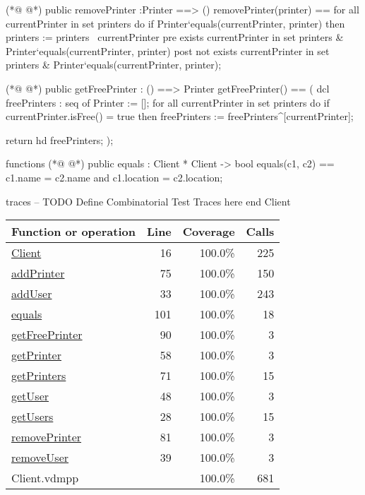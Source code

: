 \begin{vdmpp}[breaklines=true]
(*@
\label{removePrinter:81}
@*)
 public removePrinter :Printer ==> ()
  removePrinter(printer) ==
   for all currentPrinter in set printers do
    if Printer`equals(currentPrinter, printer) 
    then printers := printers \ {currentPrinter}
  pre exists currentPrinter in set printers & Printer`equals(currentPrinter, printer)
  post not exists currentPrinter  in set printers & Printer`equals(currentPrinter, printer);
  
  
(*@
\label{getFreePrinter:90}
@*)
 public getFreePrinter : () ==> Printer
 getFreePrinter() == (
 dcl freePrinters : seq of Printer := [];
 for all currentPrinter in set printers do
  if currentPrinter.isFree() = true
  then freePrinters := freePrinters^[currentPrinter];
  
  return hd freePrinters;
  );
  
functions
(*@
\label{equals:101}
@*)
public equals : Client * Client -> bool
equals(c1, c2) ==
  c1.name = c2.name and c1.location = c2.location;

traces
-- TODO Define Combinatorial Test Traces here
end Client
\end{vdmpp}
\bigskip
\begin{longtable}{|l|r|r|r|}
\hline
Function or operation & Line & Coverage & Calls \\
\hline
\hline
\hyperref[Client:16]{Client} & 16&100.0\% & 225 \\
\hline
\hyperref[addPrinter:75]{addPrinter} & 75&100.0\% & 150 \\
\hline
\hyperref[addUser:33]{addUser} & 33&100.0\% & 243 \\
\hline
\hyperref[equals:101]{equals} & 101&100.0\% & 18 \\
\hline
\hyperref[getFreePrinter:90]{getFreePrinter} & 90&100.0\% & 3 \\
\hline
\hyperref[getPrinter:58]{getPrinter} & 58&100.0\% & 3 \\
\hline
\hyperref[getPrinters:71]{getPrinters} & 71&100.0\% & 15 \\
\hline
\hyperref[getUser:48]{getUser} & 48&100.0\% & 3 \\
\hline
\hyperref[getUsers:28]{getUsers} & 28&100.0\% & 15 \\
\hline
\hyperref[removePrinter:81]{removePrinter} & 81&100.0\% & 3 \\
\hline
\hyperref[removeUser:39]{removeUser} & 39&100.0\% & 3 \\
\hline
\hline
Client.vdmpp & & 100.0\% & 681 \\
\hline
\end{longtable}

